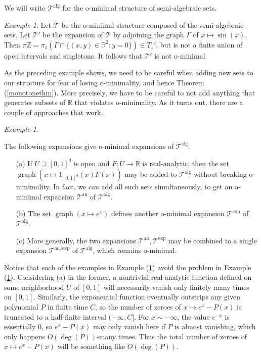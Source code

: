 \documentclass[12pt]{article}
\let\oldref\ref
\renewcommand{\ref}[1]{(\oldref{#1})}
\newcommand{\Z}{\mathbb{Z}}
\newcommand{\R}{\mathbb{R}}
\theoremstyle{definition}
\theoremstyle{remark}
\newtheorem{example}[theorem]{Example}
\numberwithin{equation}{section}
\begin{document}
We will write $\mathcal{T}^{\mathrm{alg}}$ for the o-minimal structure of semi-algebraic sets.

\begin{example}\label{badexpansion} Let $\mathcal{T}$ be the o-minimal structure composed of the semi-algebraic sets. Let $\mathcal{T}'$ be the expansion of $\mathcal{T}$ by adjoining the graph $\Gamma$ of $x\mapsto\sin(x)$. Then $\pi\Z=\pi_1(\Gamma\cap\{(x,y)\in\R^2:y=0\})\in T_1'$, but is not a finite union of open intervals and singletons. It follows that $\mathcal{T}'$ is not o-minimal.
\end{example}

As the preceding example shows, we need to be careful when adding new sets to our structure for fear of losing o-minimality, and hence Theorem \ref{monotonethm}. More precisely, we have to be careful to not add anything that generates subsets of $\R$ that violates o-minimality. As it turns out, there are a couple of approaches that work.

\begin{example}\label{goodexpansions}

The following expansions give o-minimal expansions of $\mathcal{T}^{\mathrm{alg}}$.

\begin{itemize}
    \item[(a)] If $U\supseteq[0,1]^d$ is open and $F:U\to\R$ is real-analytic, then the set $\operatorname{graph}(x\mapsto1_{[0,1]^d}(x)F(x))$ may be added to $\mathcal{T}^{\mathrm{alg}}$ without breaking o-minimality. In fact, we can add all such sets simultaneously, to get an o-minimal expansion $\mathcal{T}^{\mathrm{an}}$ of $\mathcal{T}^{\mathrm{alg}}$.
    \item[(b)] The set $\operatorname{graph}(x\mapsto e^x)$ defines another o-minimal expansion $\mathcal{T}^{\mathrm{exp}}$ of $\mathcal{T}^{\mathrm{alg}}$.
    \item[(c)] More generally, the two expansions $\mathcal{T}^{\mathrm{an}},\mathcal{T}^{\mathrm{exp}}$ may be combined to a single expansion $\mathcal{T}^{\mathrm{an,exp}}$ of $\mathcal{T}^{\mathrm{alg}}$, which remains o-minimal.
\end{itemize}
    
\end{example}

Notice that each of the examples in Example \ref{goodexpansions} avoid the problem in Example \ref{badexpansion}. Considering (a) in the former, a nontrivial real-analytic function defined on some neighborhood $U$ of $[0,1]$ will necessarily vanish only finitely many times on $[0,1]$. Similarly, the exponential function eventually outstrips any given polynomial $P$ in finite time $C$, so the number of zeroes of $x\mapsto e^x-P(x)$ is truncated to a half-finite interval $(-\infty,C]$. For $x\sim-\infty$, the value $e^{-x}$ is essentially $0$, so $e^x-P(x)$ may only vanish here if $P$ is almost vanishing, which only happens $O(\operatorname{deg}(P))$-many times. Thus the total number of zeroes of $x\mapsto e^x-P(x)$ will be something like $O(\operatorname{deg}(P))$.
\end{document}
